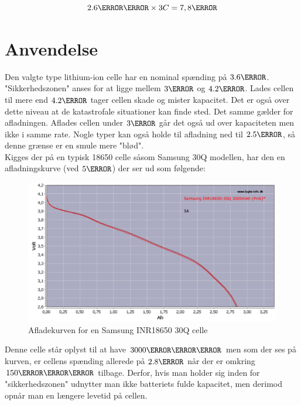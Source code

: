 \begin {equation}
2.6\ampere\hour \times 3C = 7,8\ampere
\end {equation}

\section{Anvendelse}
Den valgte type lithium-ion celle har en nominal spænding på $3.6\volt$. "Sikkerhedszonen" \space anses for at ligge mellem $3\volt$ og $4.2\volt$. Lades cellen til mere end $4.2\volt$ tager cellen skade og mister kapacitet. Det er også over dette niveau at de katastrofale situationer kan finde sted. Det samme gælder for afladningen. Aflades cellen under $3\volt$ går det også ud over kapaciteten men ikke i samme rate. Nogle typer kan også holde til afladning ned til $2.5\volt$, så denne grænse er en smule mere "blød".\\

Kigges der på en typisk 18650 celle såsom Samsung 30Q modellen, har den en afladningskurve (ved $5\ampere$) der ser ud som følgende: 

\begin{figure}[h]
\centering
\includegraphics[width=15cm]{billeder/samsung-inr18650-discharge.png}
\caption{Afladekurven for en Samsung INR18650 30Q celle\protect\footnotemark}
\label{fig:30q_discharge}
\end{figure}

Denne celle står oplyst til at have $3000\milli\ampere\hour$ men som der ses på kurven, er cellens spænding allerede på $2.8\volt$ når der er omkring $150\milli\ampere\hour$ tilbage. Derfor, hvis man holder sig inden for "sikkerhedszonen" \space udnytter man ikke batteriets fulde kapacitet, men derimod opnår man en længere levetid på cellen. \\

